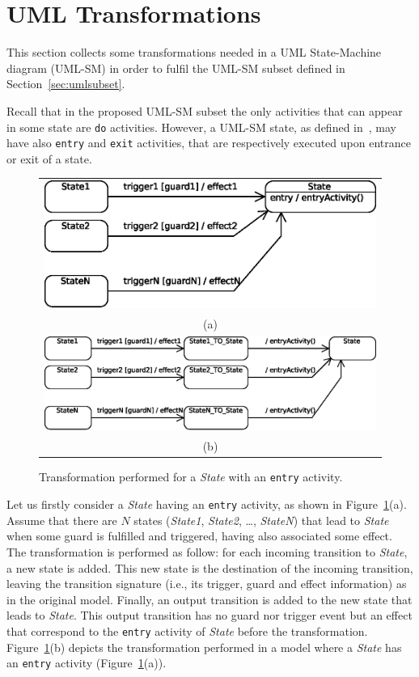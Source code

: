 \section{UML Transformations}
\label{sec:umltransformations}

This section collects some transformations needed in a UML State-Machine
diagram (UML-SM) in order to fulfil the UML-SM subset defined in
Section~\ref{sec:umlsubset}. 

Recall that in the proposed UML-SM subset the only activities that can appear in
some state are {\tt do} activities. However, a UML-SM state, as defined
in~\cite{UML-OMG-11}, may have also {\tt entry} and {\tt exit} activities, that
are respectively executed upon entrance or exit of a state.

\begin{figure}
\centering
  \begin{tabular}{c}
  \includegraphics[width=0.7\columnwidth]{images/entryActionsBEFORE}\\ 
(a)\\
  \includegraphics[width=0.85\columnwidth]{images/entryActionsAFTER}\\
(b)
  \end{tabular}
  \caption{Transformation performed for a {\em State} with an {\tt entry}
activity.}
  \label{fig:entryActions}
\end{figure}

Let us firstly consider a {\em State} having an {\tt entry} activity, as
shown in Figure~\ref{fig:entryActions}(a). Assume that there are $N$ states
({\em State1}, {\em State2}, \ldots, {\em StateN}) that lead to {\em State} when
some guard is fulfilled and triggered, having also associated some effect. The
transformation is performed as follow: for each incoming transition to {\em
State}, a new state is added. This new state is the destination of the incoming
transition, leaving the transition signature (i.e., its trigger, guard and
effect information) as in the original model. Finally, an output transition is
added to the new state that leads to {\em State}. This output transition has no
guard nor trigger event but an effect that correspond to the {\tt entry}
activity of {\em State} before the transformation.
Figure~\ref{fig:entryActions}(b) depicts the transformation performed in a
 model where a {\em State} has an {\tt entry} activity
(Figure~\ref{fig:entryActions}(a)).


